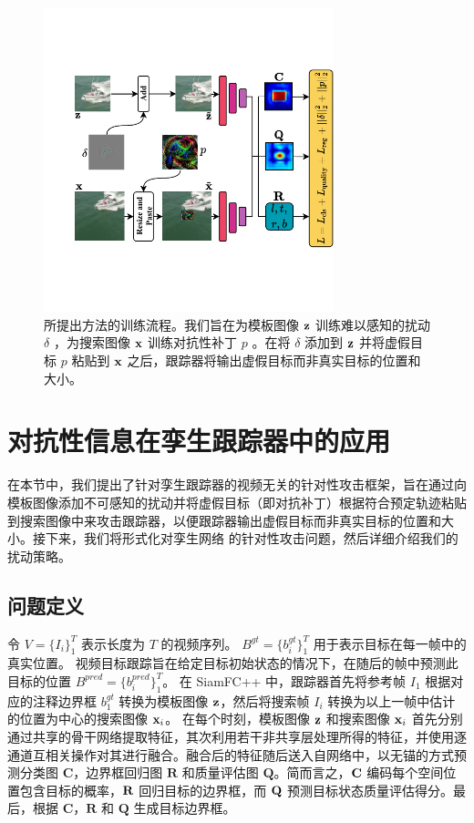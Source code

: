 \begin{figure}[t]
\centering
\includegraphics[width=0.75\textwidth]{Img/attack/network_v5.pdf}
\caption{所提出方法的训练流程。我们旨在为模板图像 $\textbf z$ 训练难以感知的扰动 $\delta$ ，为搜索图像 $\textbf x$ 训练对抗性补丁 $p$ 。在将 $\delta$ 添加到 $\textbf z$ 并将虚假目标 $p$ 粘贴到 $\textbf x$ 之后，跟踪器将输出虚假目标而非真实目标的位置和大小。}
\label{fig:net}
\end{figure}

\section{对抗性信息在孪生跟踪器中的应用}
在本节中，我们提出了针对孪生跟踪器的视频无关的针对性攻击框架，旨在通过向模板图像添加不可感知的扰动并将虚假目标（即对抗补丁）根据符合预定轨迹粘贴到搜索图像中来攻击跟踪器，以便跟踪器输出虚假目标而非真实目标的位置和大小。接下来，我们将形式化对孪生网络 \cite{SiamFC++} 的针对性攻击问题，然后详细介绍我们的扰动策略。

\subsection{问题定义}
令 $V=\{I_i\}_1^T$ 表示长度为 $T$ 的视频序列。
$B^{gt}=\{b^{gt}_i\}_1^T$ 用于表示目标在每一帧中的真实位置。
视频目标跟踪旨在给定目标初始状态的情况下，在随后的帧中预测此目标的位置 $B^{pred}=\{b^{pred}_i\}_1^T$。
在 SiamFC++ 中，跟踪器首先将参考帧 $I_1$ 根据对应的注释边界框 $b_1^{gt}$ 转换为模板图像 $\textbf z$，然后将搜索帧 $I_i$ 转换为以上一帧中估计的位置为中心的搜索图像 $\textbf x_i$。
在每个时刻，模板图像 $\textbf z$ 和搜索图像 $\textbf x_i$ 首先分别通过共享的骨干网络提取特征，其次利用若干非共享层处理所得的特征，并使用逐通道互相关操作对其进行融合。融合后的特征随后送入自网络中，以无锚的方式预测分类图 $\textbf{C}$，边界框回归图 $\textbf{R}$ 和质量评估图 $\textbf{Q}$。简而言之，$\textbf C$ 编码每个空间位置包含目标的概率，$\textbf R$ 回归目标的边界框，而 $\textbf Q$ 预测目标状态质量评估得分。最后，根据 $\textbf{C}$，$\textbf{R}$ 和 $\textbf{Q}$ 生成目标边界框。

